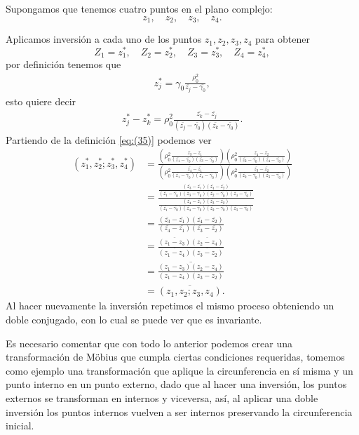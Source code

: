 \documentclass{matematicasud}
\begin{document}
\begin{example}
    Supongamos que tenemos cuatro puntos en el plano complejo:
    \begin{equation*}
        z_1,\quad
        z_2, \quad
        z_3, \quad
        z_4.
    \end{equation*}
    
    Aplicamos inversión a cada uno de los puntos $z_1, z_2, z_3, z_4$ para obtener
    \begin{equation*}
        Z_1=z_1^*, \quad Z_2=z_2^*, \quad Z_3=z_3^*, \quad Z_4=z_4^*,    
    \end{equation*}
    por definición tenemos que 
    \begin{align*}
        z^*_j=\gamma_0\frac{\rho_0^2}{\bar{z_j}-\bar{\gamma_0}},
    \end{align*}
    esto quiere decir
    \begin{align*}
        z^*_j-z^*_k=\rho_0^2\frac{\bar{z_k}-\bar{z_j}}{(\bar{z_j}-\bar{\gamma_0})(\bar{z_k}-\bar{\gamma_0})}.
    \end{align*}
    Partiendo de la definición \eqref{eq:(35)} podemos ver 
    \begin{align*}
        (z_1^*,z_2^*;z_3^*,z_4^*)
        &=\frac{\left(\rho_0^2\frac{\bar{z_3}-\bar{z_1}}{(\bar{z_1}-\bar{\gamma_0})(\bar{z_3}-\bar{\gamma_0})}\right)\left(\rho_0^2\frac{\bar{z_4}-\bar{z_2}}{(\bar{z_2}-\bar{\gamma_0})(\bar{z_4}-\bar{\gamma_0})}\right)}{\left(\rho_0^2\frac{\bar{z_4}-\bar{z_1}}{(\bar{z_1}-\bar{\gamma_0})(\bar{z_4}-\bar{\gamma_0})}\right)\left(\rho_0^2\frac{\bar{z_3}-\bar{z_2}}{(\bar{z_2}-\bar{\gamma_0})(\bar{z_3}-\bar{\gamma_0})}\right)}\\
        &=\frac{\frac{(\bar{z_3}-\bar{z_1})(\bar{z_4}-\bar{z_2})}{(\bar{z_1}-\bar{\gamma_0})(\bar{z_3}-\bar{\gamma_0})(\bar{z_2}-\bar{\gamma_0})(\bar{z_4}-\bar{\gamma_0})}}{\frac{(\bar{z_4}-\bar{z_1})(\bar{z_3}-\bar{z_2})}{(\bar{z_1}-\bar{\gamma_0})(\bar{z_4}-\bar{\gamma_0})(\bar{z_2}-\bar{\gamma_0})(\bar{z_3}-\bar{\gamma_0})}}\\
        &=\frac{(\bar{z_3}-\bar{z_1})(\bar{z_4}-\bar{z_2})}{(\bar{z_4}-\bar{z_1})(\bar{z_3}-\bar{z_2})}\\
        &=\frac{\overline{(z_1-z_3)}\overline{(z_2-z_4)}}{\overline{(z_1-z_4)}\overline{(z_3-z_2)}}\\
        &=\overline{\frac{(z_1-z_3)(z_2-z_4)}{(z_1-z_4)(z_3-z_2)}}\\
        &=\overline{(z_1,z_2;z_3,z_4)}.
    \end{align*}
    Al hacer nuevamente la inversión repetimos el mismo proceso obteniendo un doble conjugado, con lo cual se puede ver que es invariante.

    Es necesario comentar que con todo lo anterior podemos crear una transformación de Möbius que cumpla ciertas condiciones requeridas, tomemos como ejemplo una transformación que aplique la circunferencia en sí misma y un punto interno en un punto externo, dado que al hacer una inversión, los puntos externos se transforman en internos y viceversa, así, al aplicar una doble inversión los puntos internos vuelven a ser internos preservando la circunferencia inicial. 
    
\end{example}
\newpage
\end{document}
